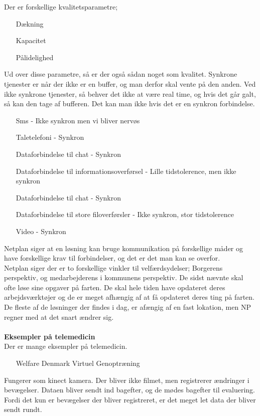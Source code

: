 Der er forskellige kvalitetsparametre; 
\begin{itemize}
\item[Dækning]
\item[Kapacitet]
\item[Pålidelighed]
\end{itemize}
Ud over disse parametre, så er der også sådan noget som kvalitet. Synkrone tjenester er når der ikke er en buffer, og man derfor skal vente på den anden. Ved ikke synkrone tjenester, så behver det ikke at være real time, og hvis det går galt, så kan den tage af bufferen. Det kan man ikke hvis det er en synkron forbindelse. \\
\begin{itemize}
\item[Sms - Ikke synkron men vi bliver nervøs]
\item[Taletelefoni - Synkron]
\item[Dataforbindelse til chat - Synkron]
\item[Dataforbindelse til informationsoverførsel - Lille tidstolerence, men ikke synkron]
\item[Dataforbindelse til chat - Synkron]
\item[Dataforbindelse til store filoverførsler - Ikke synkron, stor tidstolerence]
\item[Video - Synkron]
\end{itemize}
Netplan siger at en løsning kan bruge kommunikation på forskellige måder og have forskellige krav til forbindelser, og det er det man kan se overfor.\\
Netplan siger der er to forskellige vinkler til velfærdsydelser; Borgerens perspektiv, og medarbejderens i kommunens perspektiv. De sidst nævnte skal ofte løse sine opgaver på farten. De skal hele tiden have opdateret deres arbejdsværktøjer og de er meget afhængig af at få opdateret deres ting på farten. De fleste af de løsninger der findes i dag, er afængig af en fast lokation, men NP regner med at det snart ændrer sig.\\ \\ 
\textbf{Eksempler på telemedicin}\\
Der er mange eksempler på telemedicin.\\
\begin{itemize}
\item[Welfare Denmark Virtuel Genoptræning]
\end{itemize}
Fungerer som kinect kamera. Der bliver ikke filmet, men registrerer ændringer i bevægelser. Dataen bliver sendt ind bagefter, og de mødes bagefter til evaluering. Fordi det kun er bevægelser der bliver registreret, er det meget let data der bliver sendt rundt. \\
